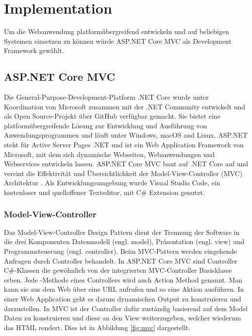 \chapter{Implementation}\label{ch:implementation}

Um die Webanwendung platformübergreifend entwickeln und auf beliebigen Systemen einsetzen zu können würde ASP.NET Core MVC als Development Framework gewählt.

\section{ASP.NET Core MVC}

Die General-Purpose-Development-Platform .NET Core wurde unter Koordination von Microsoft zusammen mit der .NET Community entwickelt und als Open Source-Projekt über GitHub \cite{dotnetcore} verfügbar gemacht. Sie bietet eine platformübergreifende Lösung zur Entwicklung und Ausführung von Anwendungsprogrammen und läuft unter Windows, macOS and Linux. ASP.NET steht für Active Server Pages .NET und ist ein Web Application Framework von Microsoft, mit dem sich dynamische Webseiten, Webanwendungen und Webservices entwickeln lassen. ASP.NET Core MVC baut auf .NET Core auf und vereint die Effektivität und Übersichtlichkeit der Model-View-Controller (MVC) Architektur \cite{freeman2016pro}. Als Entwicklungsumgebung wurde Visual Studio Code, ein kostenloser und quelloffener Texteditor, mit C\# Extension genutzt.

\subsection{Model-View-Controller}

Das Model-View-Controller Design Pattern dient der Trennung der Software in die drei Komponenten Datenmodell (engl. model), Präsentation (engl. view) und Programmsteuerung (engl. controller). Beim MVC-Pattern werden eingehende Anfragen durch Controller behandelt. In ASP.NET Core MVC sind Controller C\#-Klassen die gewöhnlich von der integrierten MVC-Controller Basisklasse  erben. Jede -Methode eines Controllers wird auch Action Method genannt. Man kann sie aus dem Web über eine URL aufrufen und so eine Aktion ausführen. In einer Web Application geht es darum dynamischen Output zu konstruieren und darzustellen. In MVC ist der Controller dafür zuständig basierend auf dem Model Daten zu konstruieren und diese an den View weiterzugeben, welcher wiederum das HTML rendert. Dies ist in Abbildung \ref{fig:mvc} dargestellt.

